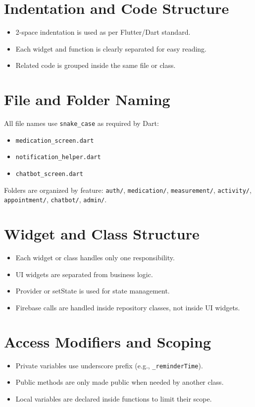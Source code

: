 \documentclass[12pt, a4paper, oneside]{report}
\begin{document}
\section{Indentation and Code Structure}
\begin{itemize}
    \item 2-space indentation is used as per Flutter/Dart standard.
    \item Each widget and function is clearly separated for easy reading.
    \item Related code is grouped inside the same file or class.
\end{itemize}

\section{File and Folder Naming}
All file names use \texttt{snake\_case} as required by Dart:
\begin{itemize}
    \item \texttt{medication\_screen.dart}
    \item \texttt{notification\_helper.dart}
    \item \texttt{chatbot\_screen.dart}
\end{itemize}
Folders are organized by feature: \texttt{auth/}, \texttt{medication/}, \texttt{measurement/}, \texttt{activity/}, \texttt{appointment/}, \texttt{chatbot/}, \texttt{admin/}.

\section{Widget and Class Structure}
\begin{itemize}
    \item Each widget or class handles only one responsibility.
    \item UI widgets are separated from business logic.
    \item Provider or setState is used for state management.
    \item Firebase calls are handled inside repository classes, not inside UI widgets.
\end{itemize}

\section{Access Modifiers and Scoping}
\begin{itemize}
    \item Private variables use underscore prefix (e.g., \texttt{\_reminderTime}).
    \item Public methods are only made public when needed by another class.
    \item Local variables are declared inside functions to limit their scope.
\end{itemize}
\end{document}
